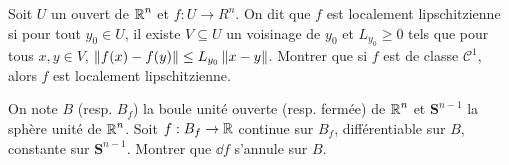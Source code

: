 \begin{exo}
    \label{cd1}
    Soit $U$ un ouvert de $\operatorname{\mathbb R}^n$ et $f:U\to R^n$. 
    On dit que $f$ est localement lipschitzienne si pour tout $y_0\in U$, 
    il existe $V\subseteq U$ un voisinage de $y_0$ et $L_{y_0}\geq 0$ tels que pour tous $x,y\in V$, $\left\lVert f(x)-f(y)\right\rVert\leq L_{y_0}\left\lVert x-y\right\rVert$.
    Montrer que si $f$ est de classe $\mathcal C^1$, alors $f$ est localement lipschitzienne. 
\end{exo}

\begin{exo}
    \label{cd2}
    On note $B$ (resp. $B_f$) la boule unité ouverte (resp. fermée) de $\operatorname{\mathbb R}^n$ et $\mathbf S^{n-1}$ la sphère unité de $\operatorname{\mathbb R}^n$.
    Soit $f:B_f\to\operatorname{\mathbb R}$ continue sur $B_f$, différentiable sur $B$, constante sur $\mathbf S^{n-1}$.
    Montrer que $\dd f$ s'annule sur $B$.
\end{exo}